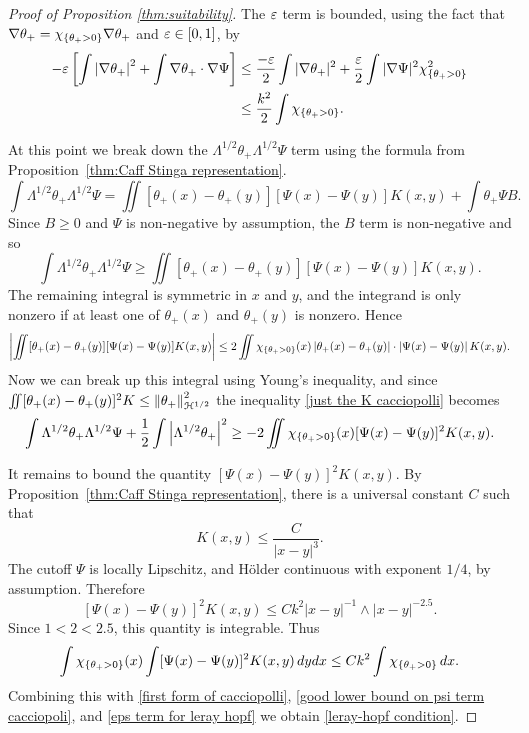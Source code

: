 \begin{proof}[Proof of Proposition \ref{thm:suitability}]
The $\varepsilon$ term is bounded, using the fact that $\nabla\theta_+ = \chi_{\{\theta_+ > 0\}} \nabla\theta_+$ and $\varepsilon \in [0,1]$, by
\begin{equation} \label{eps term for leray hopf} \begin{aligned}
-\varepsilon\left[ \int \left\lvert \nabla\theta_+ \right\rvert^2 + \int \nabla\theta_+ \cdot \nabla\Psi \right] &\leq \frac{-\varepsilon}{2} \int |\nabla\theta_+|^2 + \frac{\varepsilon}{2} \int |\nabla\Psi|^2 \chi_{\{\theta_+ > 0\}}^2
\\ &\leq \frac{k^2}{2} \int \chi_{\{\theta_+ > 0\}}.
\end{aligned} \end{equation}

At this point we break down the $\Lambda^{1/2} \theta_+ \Lambda^{1/2} \Psi$ term using the formula from Proposition~\ref{thm:Caff Stinga representation}.  
\[ \int \Lambda^{1/2} \theta_+ \Lambda^{1/2} \Psi = \iint [\theta_+(x)-\theta_+(y)][\Psi(x)-\Psi(y)] K(x,y) + \int \theta_+ \Psi B. \]
Since $B \geq 0$ and $\Psi$ is non-negative by assumption, the $B$ term is non-negative and so
\begin{equation} \label{just the K cacciopolli} \int \Lambda^{1/2} \theta_+ \Lambda^{1/2} \Psi \geq \iint [\theta_+(x)-\theta_+(y)][\Psi(x)-\Psi(y)] K(x,y). \end{equation}
The remaining integral is symmetric in $x$ and $y$, and the integrand is only nonzero if at least one of $\theta_+(x)$ and $\theta_+(y)$ is nonzero.  Hence
\[ \left\lvert \iint [\theta_+(x)-\theta_+(y)][\Psi(x)-\Psi(y)] K(x,y) \right\rvert \leq 2 \iint \chi_{\{\theta_+>0\}}(x) \left\lvert \theta_+(x)-\theta_+(y) \right\rvert \cdot \left\lvert \Psi(x)-\Psi(y) \right\rvert K(x,y). \]
Now we can break up this integral using Young's inequality, and since $\iint [\theta_+(x)-\theta_+(y)]^2K \leq \left\lVert\theta_+\right\rVert_{\mathcal{H}^{1/2}}^2$ the inequality \eqref{just the K cacciopolli} becomes
\begin{equation} \label{good lower bound on psi term cacciopoli}
\int \Lambda^{1/2} \theta_+ \Lambda^{1/2} \Psi + \frac{1}{2} \int \left\lvert \Lambda^{1/2}\theta_+ \right\rvert^2 \geq - 2 \iint \chi_{\{\theta_+>0\}}(x) [\Psi(x)-\Psi(y)]^2 K(x,y). 
\end{equation}

It remains to bound the quantity $[\Psi(x)-\Psi(y)]^2 K(x,y)$.  By Proposition~\ref{thm:Caff Stinga representation}, there is a universal constant $C$ such that
\[ K(x,y) \leq \frac{C}{|x-y|^{3}}. \]
The cutoff $\Psi$ is locally Lipschitz, and H\"{o}lder continuous with exponent $1/4$, by assumption.  Therefore 
\[ [\Psi(x)-\Psi(y)]^2 K(x,y) \leq Ck^2 |x-y|^{-1} \wedge |x-y|^{-2.5}. \]
Since $1 < 2 < 2.5$, this quantity is integrable.  Thus
\[ \int \chi_{\{\theta_+>0\}}(x) \int [\Psi(x)-\Psi(y)]^2 K(x,y) \,dydx \leq C k^2 \int \chi_{\{\theta_+>0\}} \,dx. \]
Combining this with \eqref{first form of cacciopolli}, \eqref{good lower bound on psi term cacciopoli}, and \eqref{eps term for leray hopf} we obtain \eqref{leray-hopf condition}.  


\end{proof}
